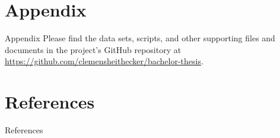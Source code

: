 \documentclass{beamer}
\newif\ifSectionTitlePage
\newcommand\NextSectionWithoutTitlePage{\SectionTitlePagefalse}
\begin{document}
\NextSectionWithoutTitlePage
\section{Appendix}

\begin{frame}{Appendix}
	Please find the data sets, scripts, and other supporting files and documents in the project's GitHub repository at \url{https://github.com/clemensheithecker/bachelor-thesis}.
\end{frame}


\NextSectionWithoutTitlePage
\section{References}

\begin{frame}[t]{References}
	\printbibliography[heading=none]
\end{frame}
\end{document}
